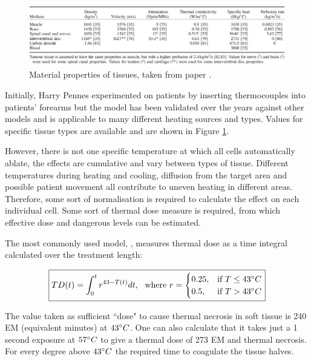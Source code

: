 \documentclass[11pt]{article} %
\begin{document}
	
	
	\begin{figure}
		\centering
		\includegraphics[width=1\linewidth]{Report_images/tissueproperties}
		\caption{Material properties of tissues, taken from paper \cite{Scott2014}.}
		\label{fig:tissueproperties}
	\end{figure}
	
	Initially, Harry Pennes experimented on patients by inserting thermocouples into patients' forearms but the model has been validated over the years against other models and is applicable to many different heating sources and types. Values for specific tissue types are available and are shown in Figure \ref{fig:tissueproperties}. 
	
	However, there is not one specific temperature at which all cells automatically ablate, the effects are cumulative and vary between types of tissue. Different temperatures during heating and cooling, diffusion from the target area and possible patient movement all contribute to uneven heating in different areas. Therefore, some sort of normalisation is required to calculate the effect on each individual cell. Some sort of thermal dose measure is required, from which effective dose and dangerous levels can be estimated. 
	
	
	
	The most commonly used model, \cite{Sapareto1984a},  measures thermal dose as a time integral calculated over the treatment length:
	
\begin{equation}
\boxed{TD(t)=\int_{0}^{t}r^{43-T(t)}dt,\ \ \text{where  } r=
\begin{cases}
0.25, & \text{if}\ T\leq 43 \degree C \\
0.5, & \text{if}\ T>43 \degree C 
\end{cases}}
\label{Sapereto}
\end{equation}
	
	The value taken as sufficient ``dose" to cause thermal necrosis in soft tissue is 240 EM (equivalent minutes) at $43 \degree C $. One can also calculate that it takes just a 1 second exposure at $57 \degree C $ to give a thermal dose of 273 EM and thermal necrosis. For every degree above  $43 \degree C $ the required time to coagulate the tissue halves. 
	
\end{document}
